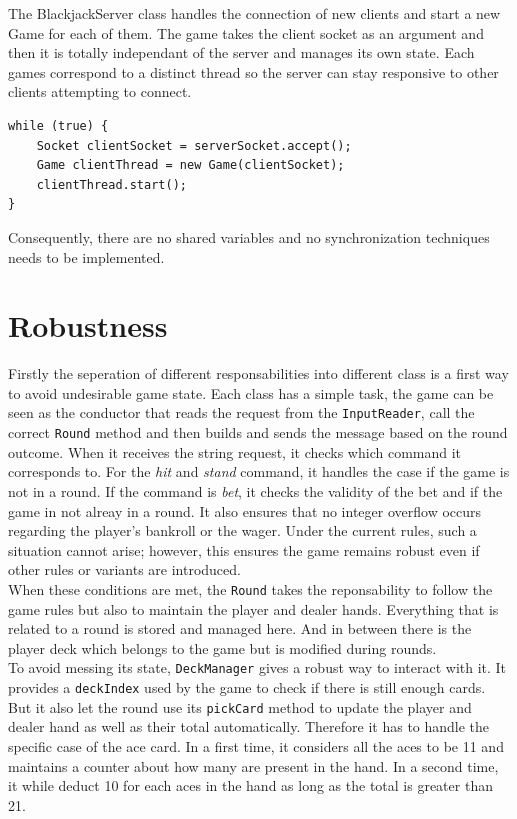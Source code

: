 \documentclass[11pt]{article}
\begin{document}
The BlackjackServer class handles the connection of new clients and start a new Game for each of them. The game takes the client socket as an argument and then it is totally independant of the server and manages its own state. Each games correspond to a distinct thread so the server can stay responsive to other clients attempting to connect.
\begin{verbatim}
while (true) {
    Socket clientSocket = serverSocket.accept();
    Game clientThread = new Game(clientSocket);
    clientThread.start();
}
\end{verbatim}
Consequently, there are no shared variables and no synchronization techniques needs to be implemented.

\section{Robustness}

Firstly the seperation of different responsabilities into different class is a first way to avoid undesirable game state.
Each class has a simple task, the game can be seen as the conductor that reads the request from the \texttt{InputReader}, call the correct \texttt{Round} method and then builds and sends the message based on the round outcome.
When it receives the string request, it checks which command it corresponds to. For the \textit{hit} and \textit{stand} command, it handles the case if the game is not in a round.
If the command is \textit{bet}, it checks the validity of the bet and if the game in not alreay in a round.
It also ensures that no integer overflow occurs regarding the player’s bankroll or the wager. Under the current rules, such a situation cannot arise; however, this ensures the game remains robust even if other rules or variants are introduced.\\
When these conditions are met, the \texttt{Round} takes the reponsability to follow the game rules but also to maintain the player and dealer hands. Everything that is related to a round is stored and managed here.
And in between there is the player deck which belongs to the game but is modified during rounds.\\
To avoid messing its state, \texttt{DeckManager} gives a robust way to interact with it. It provides a \texttt{deckIndex} used by the game to check if there is still enough cards. But it also let the round use its \texttt{pickCard} method to update the player and dealer hand as well as their total automatically.
Therefore it has to handle the specific case of the ace card. In a first time, it considers all the aces to be 11 and maintains a counter about how many are present in the hand.
In a second time, it while deduct 10 for each aces in the hand as long as the total is greater than 21.
\end{document}
